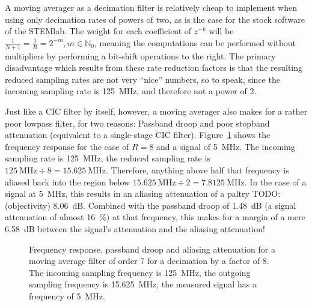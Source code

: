 A moving averager as a decimation filter is relatively cheap to implement when
using only  decimation rates of powers  of two, as  is the case for  the stock
software of the  STEMlab. The weight for each coefficient of  $z^{-k}$ will be
$\frac{1}{N+1}  =  \frac{1}{R} =  2^{-m},  m  \in \mathbb{N}_0$,  meaning  the
computations can  be performed without  multipliers by performing  a bit-shift
operations to  the right. The  primary disadvantage  which results  from these
rate reduction  factors is that the  resulting reduced sampling rates  are not
very  ``nice'' numbers,  so  to speak,  since the  incoming  sampling rate  is
\SI{125}{\MHz}, and therefore not a power of \num{2}.

Just  like a  CIC filter  by  itself, however,  a moving  averager also  makes
for  a  rather  poor  lowpass  filter, for  two  reasons: Passband  droop  and
poor  stopband   attenuation  (equivalent  to  a   single-stage  CIC  filter).
Figure~\ref{fig:stl125:moving_averager} shows  the frequency response  for the
case of  $R=8$ and  a signal  of \SI{5}{\MHz}. The  incoming sampling  rate is
\SI{125}{\MHz},  the  reduced  sampling  rate  is  $\SI{125}{\MHz}  \div  8  =
\SI{15.625}{\MHz}$. Therefore, anything  above half that frequency  is aliased
back into the region below $\SI{15.625}{\MHz} \div 2 = \SI{7.8125}{\MHz}$.  In
the case of a signal at  \SI{5}{\MHz}, this results in an aliasing attenuation
of a paltry TODO: (objectivity) \SI{8.06}{\dB}. Combined with the passband droop of \SI{1.48}{\dB}
(a signal  attenuation of  almost \SI{16}{\percent})  at that  frequency, this
makes for a  margin of a mere \SI{6.58}{\dB} between  the signal's attenuation
and the aliasing attenuation!

\begin{figure}
    \centering
    
    \caption[Frequency Response of Moving Averager: Example]{%
        Frequency  response, passband  droop  and aliasing  attenuation for  a
        moving  average  filter  of  order  \num{7}  for  a  decimation  by  a
        factor of \num{8}. The incoming  sampling frequency is \SI{125}{\MHz},
        the  outgoing sampling  frequency is  \SI{15.625}{\MHz}, the  measured
        signal  has   a  frequency   of  \SI{5}{MHz}.%
    }
    \label{fig:stl125:moving_averager}
\end{figure}

